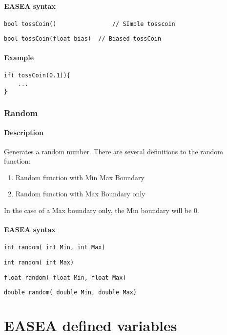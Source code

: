 \documentclass{book}
\begin{document}
\paragraph{EASEA syntax}\label{easea-syntax}

\texttt{bool~tossCoin()~~~~~~~~~~~~~~~~//~SImple~tosscoin}

\texttt{bool~tossCoin(float~bias)~~//~Biased~tossCoin}

\paragraph{Example}\label{example}

\texttt{if(~tossCoin(0.1))\{}\\\texttt{~~~~...}\\\texttt{\}}

\subsubsection{Random}\label{random}

\paragraph{Description}\label{description-1}

Generates a random number. There are several definitions to the random
function:

\begin{enumerate}
\itemsep1pt\parskip0pt
\item
  Random function with Min Max Boundary
\item
  Random function with Max Boundary only
\end{enumerate}

In the case of a Max boundary only, the Min boundary will be 0.

\paragraph{EASEA syntax}\label{easea-syntax-1}

\texttt{int~random(~int~Min,~int~Max)}

\texttt{int~random(~int~Max)}

\texttt{float~random(~float~Min,~float~Max)}

\texttt{double~random(~double~Min,~double~Max)}


\section{EASEA defined variables}
\end{document}
